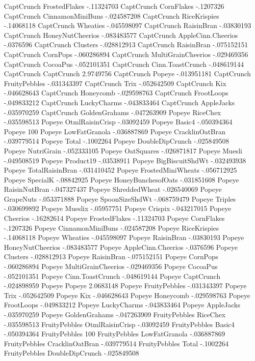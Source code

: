 CaptCrunch	FrostedFlakes	-.11324703
CaptCrunch	CornFlakes	-.1207326
CaptCrunch	CinnamonMiniBuns	-.024587208
CaptCrunch	RiceKrispies	-.14068118
CaptCrunch	Wheaties	-.045598097
CaptCrunch	RaisinBran	-.03830193
CaptCrunch	HoneyNutCheerios	-.083483577
CaptCrunch	AppleCinn.Cheerios	-.0376596
CaptCrunch	Clusters	-.028812913
CaptCrunch	RaisinBran	-.075152151
CaptCrunch	CornPops	-.060286894
CaptCrunch	MultiGrainCheerios	-.029469356
CaptCrunch	CocoaPus	-.052101351
CaptCrunch	Cinn.ToastCrunch	-.048619144
CaptCrunch	CaptCrunch	2.9749756
CaptCrunch	Popeye	-.013951181
CaptCrunch	FruityPebbles	-.031343397
CaptCrunch	Trix	-.052642509
CaptCrunch	Kix	-.046628643
CaptCrunch	Honeycomb	-.029598763
CaptCrunch	FrootLoops	-.049833212
CaptCrunch	LuckyCharms	-.043833464
CaptCrunch	AppleJacks	-.035970259
CaptCrunch	GoldenGrahams	-.047263909
Popeye	RiceChex	-.035598513
Popeye	OtmlRaisinCrisp	-.03092459
Popeye	Basic4	-.050394364
Popeye	100%
Popeye	LowFatGranola	-.036887869
Popeye	CracklinOatBran	-.039779514
Popeye	Total	-.1002264
Popeye	DoubleDipCrunch	-.025849508
Popeye	NutriGrain	-.052333105
Popeye	OatSquares	-.026871817
Popeye	Muesli	-.049508519
Popeye	Product19	-.03538911
Popeye	BigBiscuitShdWt	-.032493938
Popeye	TotalRaisinBran	-.031410452
Popeye	FrostedMiniWheats	-.056712925
Popeye	SpecialK	-.08842925
Popeye	HoneyBunchesofOats	-.031851608
Popeye	RaisinNutBran	-.047327437
Popeye	ShreddedWheat	-.026540069
Popeye	GrapeNuts	-.053371888
Popeye	SpoonSizeShdWt	-.068759479
Popeye	Triples	-.030699892
Popeye	Mueslix	-.05957751
Popeye	Crispix	-.043217015
Popeye	Cheerios	-.16282614
Popeye	FrostedFlakes	-.11324703
Popeye	CornFlakes	-.1207326
Popeye	CinnamonMiniBuns	-.024587208
Popeye	RiceKrispies	-.14068118
Popeye	Wheaties	-.045598097
Popeye	RaisinBran	-.03830193
Popeye	HoneyNutCheerios	-.083483577
Popeye	AppleCinn.Cheerios	-.0376596
Popeye	Clusters	-.028812913
Popeye	RaisinBran	-.075152151
Popeye	CornPops	-.060286894
Popeye	MultiGrainCheerios	-.029469356
Popeye	CocoaPus	-.052101351
Popeye	Cinn.ToastCrunch	-.048619144
Popeye	CaptCrunch	-.024898959
Popeye	Popeye	2.0683148
Popeye	FruityPebbles	-.031343397
Popeye	Trix	-.052642509
Popeye	Kix	-.046628643
Popeye	Honeycomb	-.029598763
Popeye	FrootLoops	-.049833212
Popeye	LuckyCharms	-.043833464
Popeye	AppleJacks	-.035970259
Popeye	GoldenGrahams	-.047263909
FruityPebbles	RiceChex	-.035598513
FruityPebbles	OtmlRaisinCrisp	-.03092459
FruityPebbles	Basic4	-.050394364
FruityPebbles	100%
FruityPebbles	LowFatGranola	-.036887869
FruityPebbles	CracklinOatBran	-.039779514
FruityPebbles	Total	-.1002264
FruityPebbles	DoubleDipCrunch	-.025849508
